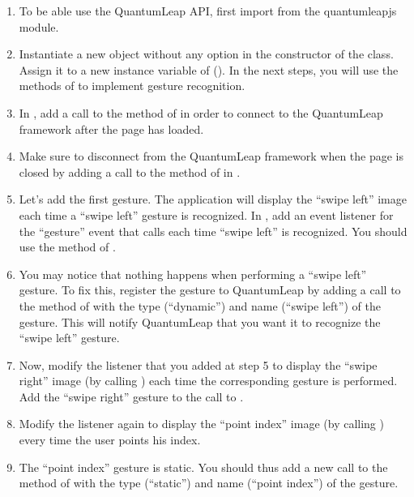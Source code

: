 {\sloppy
\begin{enumerate}
    \item To be able use the QuantumLeap API, first import  from the quantumleapjs module.
    \item Instantiate a new  object without any option in the constructor of the  class. Assign it to a new instance variable of  (\eg {}). In the next steps, you will use the methods of  to implement gesture recognition.
    \item In , add a call to the  method of  in order to connect to the QuantumLeap framework after the page has loaded.
    \item Make sure to disconnect from the QuantumLeap framework when the page is closed by adding a call to the  method of  in .
    \item Let's add the first gesture. The application will display the ``swipe left'' image each time a ``swipe left'' gesture is recognized. In , add an event listener for the ``gesture'' event that calls  each time ``swipe left'' is recognized. You should use the  method of .
    \item You may notice that nothing happens when performing a ``swipe left'' gesture. To fix this, register the gesture to QuantumLeap by adding a call to the  method of  with the type (``dynamic'') and name (``swipe left'') of the gesture. This will notify QuantumLeap that you want it to recognize the ``swipe left'' gesture.
    \item Now, modify the listener that you added at step 5 to display the ``swipe right'' image (by calling ) each time the corresponding gesture is performed. Add the ``swipe right'' gesture to the call to .
    \item Modify the listener again to display the ``point index'' image (by calling ) every time the user points his index.
    \item The ``point index'' gesture is static. You should thus add a new call to the  method of  with the type (``static'') and name (``point index'') of the gesture.

\end{enumerate}}

